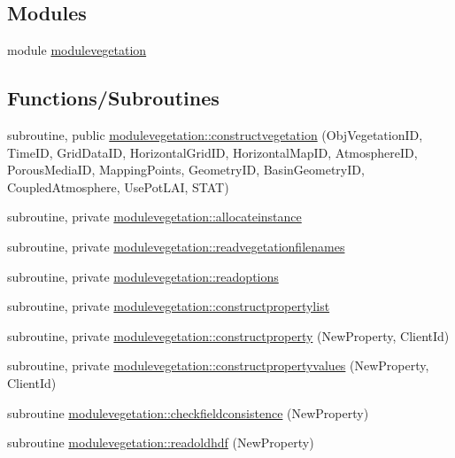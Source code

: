 \subsection*{Modules}
\begin{DoxyCompactItemize}
\item 
module \mbox{\hyperlink{namespacemodulevegetation}{modulevegetation}}
\end{DoxyCompactItemize}
\subsection*{Functions/\+Subroutines}
\begin{DoxyCompactItemize}
\item 
subroutine, public \mbox{\hyperlink{namespacemodulevegetation_ad61df3e43415a3c06f75588d06f77cce}{modulevegetation\+::constructvegetation}} (Obj\+Vegetation\+ID, Time\+ID, Grid\+Data\+ID, Horizontal\+Grid\+ID, Horizontal\+Map\+ID, Atmosphere\+ID, Porous\+Media\+ID, Mapping\+Points, Geometry\+ID, Basin\+Geometry\+ID, Coupled\+Atmosphere, Use\+Pot\+L\+AI, S\+T\+AT)
\item 
subroutine, private \mbox{\hyperlink{namespacemodulevegetation_a1f6f35f8c49c08345fa70db3965f5763}{modulevegetation\+::allocateinstance}}
\item 
subroutine, private \mbox{\hyperlink{namespacemodulevegetation_a8edd281bd5f3e5d91a3fea4575a31396}{modulevegetation\+::readvegetationfilenames}}
\item 
subroutine, private \mbox{\hyperlink{namespacemodulevegetation_af3a330cccc5b43beef6be4d97ca341ad}{modulevegetation\+::readoptions}}
\item 
subroutine, private \mbox{\hyperlink{namespacemodulevegetation_aa8b34aba441105ada4ef33de5fb88008}{modulevegetation\+::constructpropertylist}}
\item 
subroutine, private \mbox{\hyperlink{namespacemodulevegetation_ac179d0f21b5052db939c21c142a5dda5}{modulevegetation\+::constructproperty}} (New\+Property, Client\+Id)
\item 
subroutine, private \mbox{\hyperlink{namespacemodulevegetation_ad3fa17b279df119d651bb732e62a4f43}{modulevegetation\+::constructpropertyvalues}} (New\+Property, Client\+Id)
\item 
subroutine \mbox{\hyperlink{namespacemodulevegetation_ac0764a40d57c0889573171b3f85afbf3}{modulevegetation\+::checkfieldconsistence}} (New\+Property)
\item 
subroutine \mbox{\hyperlink{namespacemodulevegetation_a0a43607cdb2236530e5fb3fefa7498f1}{modulevegetation\+::readoldhdf}} (New\+Property)

\end{DoxyCompactItemize}
